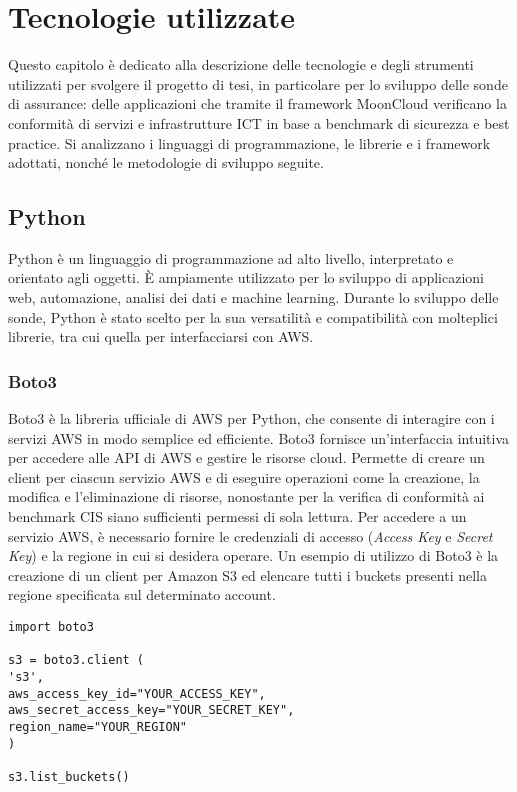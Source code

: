 \chapter{Tecnologie utilizzate}
\label{cap:tecnologie}

Questo capitolo è dedicato alla descrizione delle tecnologie e degli strumenti utilizzati per svolgere il progetto di tesi, in particolare per lo sviluppo delle sonde di assurance: delle applicazioni che tramite il framework MoonCloud verificano la conformità di servizi e infrastrutture ICT in base a benchmark di sicurezza e best practice. Si analizzano i linguaggi di programmazione, le librerie e i framework adottati, nonché le metodologie di sviluppo seguite. 


\section{Python}
\label{sec:python}

Python è un linguaggio di programmazione ad alto livello, interpretato e orientato agli oggetti. È ampiamente utilizzato per lo sviluppo di applicazioni web, automazione, analisi dei dati e machine learning. Durante lo sviluppo delle sonde, Python è stato scelto per la sua versatilità e compatibilità con molteplici librerie, tra cui quella per interfacciarsi con AWS.

\subsection{Boto3}
\label{sec:boto3}

Boto3 è la libreria ufficiale di AWS per Python, che consente di interagire con i servizi AWS in modo semplice ed efficiente. Boto3 fornisce un'interfaccia intuitiva per accedere alle API di AWS e gestire le risorse cloud. Permette di creare un client per ciascun servizio AWS e di eseguire operazioni come la creazione, la modifica e l'eliminazione di risorse, nonostante per la verifica di conformità ai benchmark CIS siano sufficienti permessi di sola lettura. Per accedere a un servizio AWS, è necessario fornire le credenziali di accesso (\textit{Access Key} e \textit{Secret Key}) e la regione in cui si desidera operare. Un esempio di utilizzo di Boto3 è la creazione di un client per Amazon S3 ed elencare tutti i buckets presenti nella regione specificata sul determinato account.

\begin{lstlisting}[style=mypython, caption={Esempio di utilizzo di Boto3 per elencare i bucket S3}]
import boto3

s3 = boto3.client (
's3',
aws_access_key_id="YOUR_ACCESS_KEY",
aws_secret_access_key="YOUR_SECRET_KEY",
region_name="YOUR_REGION"
)

s3.list_buckets()
\end{lstlisting}


